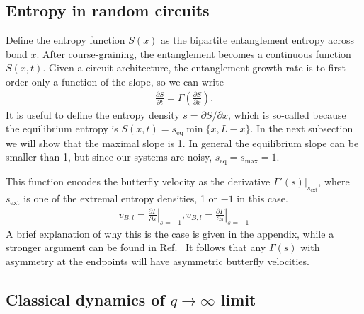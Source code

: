 \documentclass[aps,prx,reprint,superscriptaddress, longbibliography]{revtex4-1}
\begin{document}
\subsection{Entropy in random circuits} \label{sub:entropy}


Define the entropy function $S(x)$ as the bipartite entanglement entropy across bond $x$. 
After course-graining, the entanglement becomes a continuous function $S(x,t)$. Given a circuit architecture, the entanglement growth rate is to first order only a function of the slope, so we can write \cite{Jonay}
\begin{align}
\frac{\partial S}{\partial t} = \Gamma\left(\frac{\partial S}{\partial x}\right).
\end{align}
It is useful to define the entropy density $s = \partial S / \partial x$, which is so-called because the equilibrium entropy is $S(x, t) = s_\text{eq} \min\{x, L - x\}$.  In the next subsection we will show that the maximal slope is 1. In general the equilibrium slope can be smaller than 1, but since our systems are noisy, $s_\text{eq} = s_\text{max} = 1$.

This function encodes the butterfly velocity as the derivative $\Gamma'(s)|_{s_\text{ext}}$, where $s_\text{ext}$ is one of the extremal entropy densities, 1 or $-1$ in this case. 
\begin{align}
v_{B,l}=\left.\frac{\partial \Gamma}{\partial s}\right|_{s=-1}, 
v_{B,l}=\left.\frac{\partial \Gamma}{\partial s}\right|_{s=-1} 
\label{eqn:vbGamma}
\end{align}
A brief explanation of why this is the case is given in the appendix, while a stronger argument can be found in Ref.~\cite{Jonay}
It follows that any $\Gamma(s)$ with asymmetry at the endpoints will have asymmetric butterfly velocities.

\subsection{Classical dynamics of $q\to\infty$ limit} \label{classical}
\end{document}
